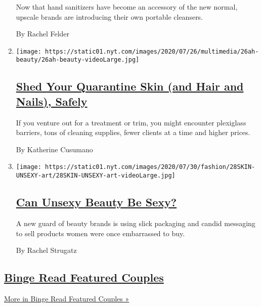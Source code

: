 \begin{enumerate}
  Now that hand sanitizers have become an accessory of the new normal,
  upscale brands are introducing their own portable cleansers.

  By Rachel Felder
\item
  \texttt{[image: https://static01.nyt.com/images/2020/07/26/multimedia/26ah-beauty/26ah-beauty-videoLarge.jpg]}

  \hypertarget{shed-your-quarantine-skin-and-hair-and-nails-safely}{%
  \subsection{\texorpdfstring{\href{/2020/07/25/at-home/coronavirus-salons.html}{Shed
  Your Quarantine Skin (and Hair and Nails),
  Safely}}{Shed Your Quarantine Skin (and Hair and Nails), Safely}}\label{shed-your-quarantine-skin-and-hair-and-nails-safely}}

  If you venture out for a treatment or trim, you might encounter
  plexiglass barriers, tons of cleaning supplies, fewer clients at a
  time and higher prices.

  By Katherine Cusumano
\item
  \texttt{[image: https://static01.nyt.com/images/2020/07/30/fashion/28SKIN-UNSEXY-art/28SKIN-UNSEXY-art-videoLarge.jpg]}

  \hypertarget{can-unsexy-beauty-be-sexy-1}{%
  \subsection{\texorpdfstring{\href{/2020/07/28/style/can-unsexy-beauty-be-sexy.html}{Can
  Unsexy Beauty Be
  Sexy?}}{Can Unsexy Beauty Be Sexy?}}\label{can-unsexy-beauty-be-sexy-1}}

  A new guard of beauty brands is using slick packaging and candid
  messaging to sell products women were once embarrassed to buy.

  By Rachel Strugatz
\end{enumerate}

\hypertarget{binge-read-featured-couples}{%
\subsection{\texorpdfstring{\href{/spotlight/wedding-announcements}{Binge
Read Featured
Couples}}{Binge Read Featured Couples}}\label{binge-read-featured-couples}}

\href{/spotlight/wedding-announcements}{More in Binge Read Featured
Couples »}

